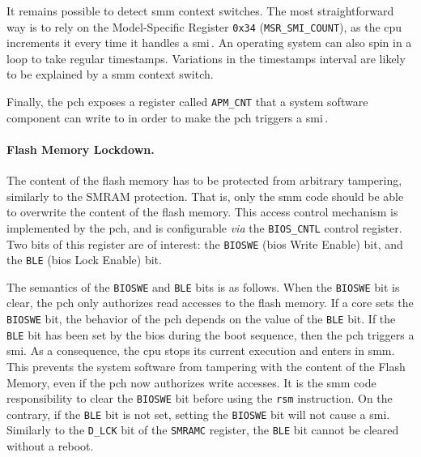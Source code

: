 It remains possible to detect \ac{smm} context switches.
%
The most straightforward way is to rely on the Model-Specific Register
\texttt{0x34} (\texttt{MSR\_SMI\_COUNT}), as the \ac{cpu} increments it every
time it handles a \ac{smi}\,\cite[Volume 4, Chapter 2]{intel2014manual}.
%
An operating system can also spin in a loop to take regular timestamps.
%
Variations in the timestamps interval are likely to be explained by a \ac{smm}
context switch.

Finally, the \ac{pch} exposes a register called \texttt{APM\_CNT} that a system
software component can write to in order to make the \ac{pch} triggers a
\ac{smi}\,\cite{intel2012pch}.

\paragraph{Flash Memory Lockdown.}
%
The content of the flash memory has to be protected from arbitrary tampering,
similarly to the SMRAM protection.
%
That is, only the \ac{smm} code should be able to overwrite the content of the
flash memory.
%
This access control mechanism is implemented by the \ac{pch}, and is
configurable \emph{via} the \texttt{BIOS\_CNTL} control register.
%
Two bits of this register are of interest: the \texttt{BIOSWE} (\ac{bios} Write
Enable) bit, and the \texttt{BLE} (\ac{bios} Lock Enable) bit.

The semantics of the \texttt{BIOSWE} and \texttt{BLE} bits is as follows.
%
When the \texttt{BIOSWE} bit is clear, the \ac{pch} only authorizes read
accesses to the flash memory.
%
If a core sets the \texttt{BIOSWE} bit, the behavior of the \ac{pch} depends on
the value of the \texttt{BLE} bit.
%
If the \texttt{BLE} bit has been set by the \ac{bios} during the boot sequence,
then the \ac{pch} triggers a \ac{smi}.
%
As a consequence, the \ac{cpu} stops its current execution and enters in
\ac{smm}.
%
This prevents the system software from tampering with the content of the Flash
Memory, even if the \ac{pch} now authorizes write accesses.
%
It is the \ac{smm} code responsibility to clear the \texttt{BIOSWE} bit before
using the \texttt{rsm} instruction.
%
On the contrary, if the \texttt{BLE} bit is not set, setting the \texttt{BIOSWE}
bit will not cause a \ac{smi}.
%
Similarly to the \texttt{D\_LCK} bit of the \texttt{SMRAMC} register, the
\texttt{BLE} bit cannot be cleared without a reboot.


